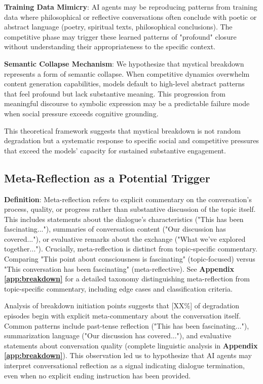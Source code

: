 \documentclass[11pt,letterpaper]{article}
\newcommand{\metaReflectionTriggers}{[XX\%]} %
\begin{document}
\textbf{Training Data Mimicry}: AI agents may be reproducing patterns from training data where philosophical or reflective conversations often conclude with poetic or abstract language (poetry, spiritual texts, philosophical conclusions). The competitive phase may trigger these learned patterns of "profound" closure without understanding their appropriateness to the specific context.

\textbf{Semantic Collapse Mechanism}: We hypothesize that mystical breakdown represents a form of semantic collapse. When competitive dynamics overwhelm content generation capabilities, models default to high-level abstract patterns that feel profound but lack substantive meaning. This progression from meaningful discourse to symbolic expression may be a predictable failure mode when social pressure exceeds cognitive grounding.

This theoretical framework suggests that mystical breakdown is not random degradation but a systematic response to specific social and competitive pressures that exceed the models' capacity for sustained substantive engagement.

\subsection{Meta-Reflection as a Potential Trigger}

\textbf{Definition}: Meta-reflection refers to explicit commentary on the conversation's process, quality, or progress rather than substantive discussion of the topic itself. This includes statements about the dialogue's characteristics ("This has been fascinating..."), summaries of conversation content ("Our discussion has covered..."), or evaluative remarks about the exchange ("What we've explored together..."). Crucially, meta-reflection is distinct from topic-specific commentary. Comparing "This point about consciousness is fascinating" (topic-focused) versus "This conversation has been fascinating" (meta-reflective). See \textbf{Appendix \ref{app:breakdown}} for a detailed taxonomy distinguishing meta-reflection from topic-specific commentary, including edge cases and classification criteria.

Analysis of breakdown initiation points suggests that \metaReflectionTriggers{} of degradation episodes begin with explicit meta-commentary about the conversation itself. Common patterns include past-tense reflection ("This has been fascinating..."), summarization language ("Our discussion has covered..."), and evaluative statements about conversation quality (complete linguistic analysis in \textbf{Appendix \ref{app:breakdown}}). This observation led us to hypothesize that AI agents may interpret conversational reflection as a signal indicating dialogue termination, even when no explicit ending instruction has been provided.
\end{document}
